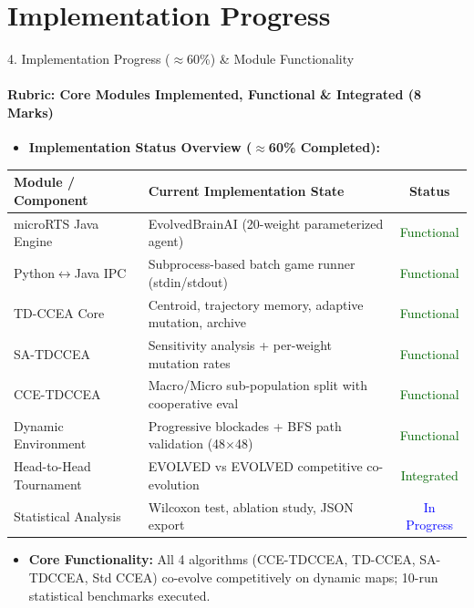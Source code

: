 \documentclass[aspectratio=169, 11pt]{beamer}
\begin{document}
\section{Implementation Progress}
\begin{frame}{4. Implementation Progress ($\approx$60\%) \& Module Functionality}
    \framesubtitle{Rubric: Core Modules Implemented, Functional \& Integrated (8 Marks)}
    \begin{itemize}
        \item \textbf{Implementation Status Overview ($\approx$60\% Completed):}
    \end{itemize}
    \vspace{-0.2cm}
    \begin{table}
        \centering
        \footnotesize
        \renewcommand{\arraystretch}{1.1}
        \begin{tabular}{p{3.8cm} p{5.0cm} c}
            \toprule
            \textbf{Module / Component} & \textbf{Current Implementation State} & \textbf{Status} \\
            \midrule
            microRTS Java Engine & EvolvedBrainAI (20-weight parameterized agent) & \textcolor{darkGreen}{Functional} \\
            Python$\leftrightarrow$Java IPC & Subprocess-based batch game runner (stdin/stdout) & \textcolor{darkGreen}{Functional} \\
            TD-CCEA Core & Centroid, trajectory memory, adaptive mutation, archive & \textcolor{darkGreen}{Functional} \\
            SA-TDCCEA & Sensitivity analysis + per-weight mutation rates & \textcolor{darkGreen}{Functional} \\
            CCE-TDCCEA & Macro/Micro sub-population split with cooperative eval & \textcolor{darkGreen}{Functional} \\
            Dynamic Environment & Progressive blockades + BFS path validation (48$\times$48) & \textcolor{darkGreen}{Functional} \\
            Head-to-Head Tournament & EVOLVED vs EVOLVED competitive co-evolution & \textcolor{darkGreen}{Integrated} \\
            Statistical Analysis & Wilcoxon test, ablation study, JSON export & \textcolor{blue}{In Progress} \\
            \bottomrule
        \end{tabular}
    \end{table}
    \vspace{0.1cm}
    \begin{itemize}\small
        \item \textbf{Core Functionality:} All 4 algorithms (CCE-TDCCEA, TD-CCEA, SA-TDCCEA, Std CCEA) co-evolve competitively on dynamic maps; 10-run statistical benchmarks executed.
    \end{itemize}
\end{frame}
\end{document}
